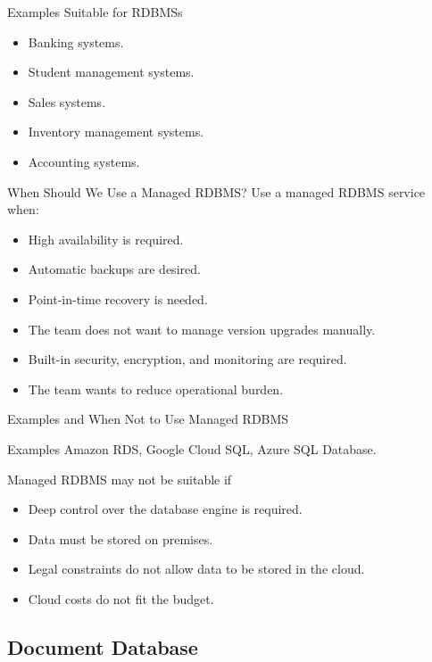 \documentclass[aspectratio=169,11pt]{beamer}
\newcommand{\smallitem}{\setlength{\itemsep}{2pt}\setlength{\parskip}{0pt}}
\begin{document}
\begin{frame}{Examples Suitable for RDBMSs}
\begin{itemize}
  \smallitem
  \item Banking systems.
  \item Student management systems.
  \item Sales systems.
  \item Inventory management systems.
  \item Accounting systems.
\end{itemize}
\end{frame}

\begin{frame}{When Should We Use a Managed RDBMS?}
Use a managed RDBMS service when:
\begin{itemize}
  \smallitem
  \item High availability is required.
  \item Automatic backups are desired.
  \item Point-in-time recovery is needed.
  \item The team does not want to manage version upgrades manually.
  \item Built-in security, encryption, and monitoring are required.
  \item The team wants to reduce operational burden.
\end{itemize}
\end{frame}

\begin{frame}{Examples and When Not to Use Managed RDBMS}
\begin{block}{Examples}
Amazon RDS, Google Cloud SQL, Azure SQL Database.
\end{block}

\begin{alertblock}{Managed RDBMS may not be suitable if}
\begin{itemize}
  \smallitem
  \item Deep control over the database engine is required.
  \item Data must be stored on premises.
  \item Legal constraints do not allow data to be stored in the cloud.
  \item Cloud costs do not fit the budget.
\end{itemize}
\end{alertblock}
\end{frame}

\subsection{Document Database}
\end{document}
